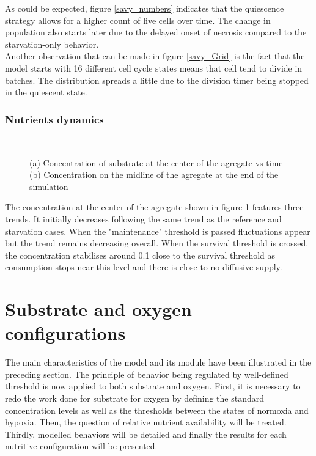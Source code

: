 \documentclass[11pt,a4paper]{article}
\begin{document}
As could be expected, figure \ref{savy_numbers} indicates that the quiescence strategy allows for a higher count of live cells over time. The change in population also starts later due to the delayed onset of necrosis compared to the starvation-only behavior.\\

Another observation that can be made in figure \ref{savy_Grid} is the fact that the model starts with 16 different cell cycle states means that cell tend to divide in batches. The distribution spreads a little due to the division timer being stopped in the quiescent state. \\

\subsubsection{Nutrients dynamics}
\begin{figure}[h]
\begin{subfigure}{0.5\textwidth}
	\centering
	
	\caption{ \label{savy_S_center}}
\end{subfigure}
~~
\begin{subfigure}{0.5\textwidth}
	\centering
	
	\caption{\label{S_savy_midline}}
\end{subfigure}
\caption{(a) Concentration of substrate at the center of the agregate vs time (b) Concentration on the midline of the agregate at the end of the simulation \label{savy_nutr}}
\end{figure}

The concentration at the center of the agregate shown in figure \ref{savy_S_center} features three trends. It initially decreases following the same trend as the reference and starvation cases. When the "maintenance" threshold is passed fluctuations appear but the trend remains decreasing overall. When the survival threshold is crossed. the concentration stabilises around 0.1 close to the survival threshold as consumption stops near this level and there is close to no diffusive supply.\\

\section{Substrate and oxygen configurations}
The main characteristics of the model and its module have been illustrated in the preceding section. The principle of behavior being regulated by well-defined threshold is now applied to both substrate and oxygen. First, it is necessary to redo the work done for substrate for oxygen by defining the standard concentration levels as well as the thresholds between the states of normoxia and hypoxia. Then, the question of relative nutrient availability will be treated. Thirdly, modelled behaviors will be detailed and finally the results for each nutritive configuration will be presented. \\
\end{document}
